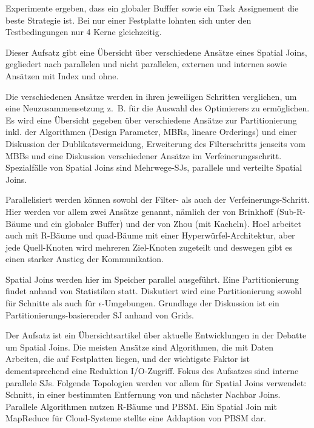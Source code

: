 \documentclass[a4paper,12pt,twoside]{article}
\begin{document}
Experimente ergeben, dass ein globaler Bufffer sowie ein Task Assignement die beste Strategie ist. Bei nur einer Festplatte lohnten sich unter den Testbedingungen nur 4 Kerne gleichzeitig. 

\textbf{}

Dieser Aufsatz gibt eine Übersicht über verschiedene Ansätze eines Spatial Joins, gegliedert nach parallelen und nicht parallelen, externen und internen sowie Ansätzen mit Index und ohne.

Die verschiedenen Ansätze werden in ihren jeweiligen Schritten verglichen, um eine Neuzusammensetzung z.~B. für die Auswahl des Optimierers zu ermöglichen. Es wird eine Übersicht gegeben über verschiedene Ansätze zur Partitionierung inkl. der Algorithmen (Design Parameter, MBRs, lineare Orderings) und einer Diskussion der Dublikatsvermeidung, Erweiterung des Filterschritts jenseits vom MBBs und eine Diskussion verschiedener Ansätze im Verfeinerungsschritt. Spezialfälle von Spatial Joins sind Mehrwege-SJs, parallele und verteilte Spatial Joins.

Parallelisiert werden können sowohl der Filter- als auch der Verfeinerungs-Schritt. Hier werden vor allem zwei Ansätze genannt, nämlich der von Brinkhoff (Sub-R-Bäume und ein globaler Buffer) und der von Zhou (mit Kacheln). Hoel arbeitet auch mit R-Bäume und quad-Bäume mit einer Hyperwürfel-Architektur, aber jede Quell-Knoten wird mehreren Ziel-Knoten zugeteilt und deswegen gibt es einen starker Anstieg der Kommunikation.

\textbf{}

Spatial Joins werden hier im Speicher parallel ausgeführt. Eine Partitionierung findet anhand von Statistiken statt. Diskutiert wird eine Partitionierung sowohl für Schnitte als auch für $\epsilon$-Umgebungen. Grundlage der Diskussion ist ein Partitionierungs-basierender SJ anhand von Grids. 

\textbf{}

Der Aufsatz ist ein Übersichtsartikel über aktuelle Entwicklungen in der Debatte um Spatial Joins. Die meisten Ansätze sind Algorithmen, die mit Daten Arbeiten, die auf Festplatten liegen, und der wichtigste Faktor ist dementsprechend eine Reduktion I/O-Zugriff. Fokus des Aufsatzes sind interne parallele SJs. Folgende Topologien werden vor allem für Spatial Joins verwendet: Schnitt, in einer bestimmten Entfernung von und nächster Nachbar Joins. Parallele Algorithmen nutzen R-Bäume und PBSM. Ein Spatial Join mit MapReduce für Cloud-Systeme stellte eine Addaption von PBSM dar. 
\end{document}
